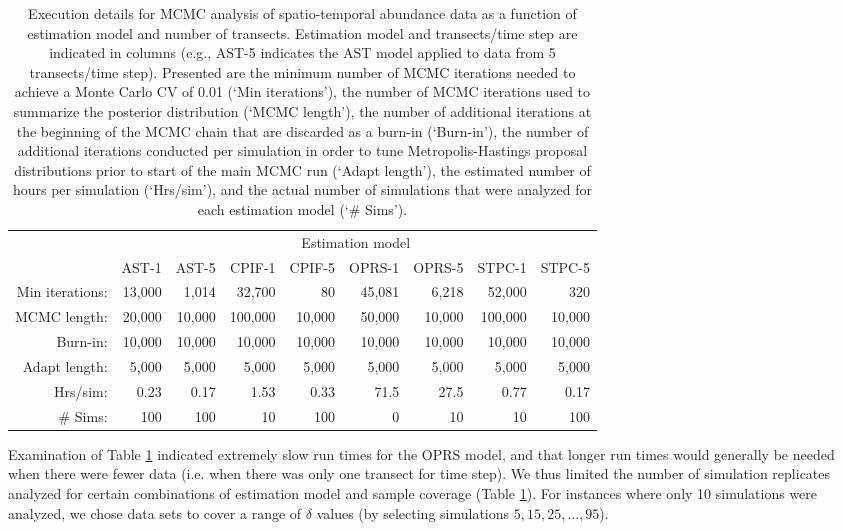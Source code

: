 \documentclass[12pt,fleqn]{article}
\begin{document}
\begin{flushleft}
\begin{table}
\caption{ Execution details for MCMC analysis of spatio-temporal abundance data as a function of estimation model and number of transects.  Estimation model and transects/time step are indicated in columns (e.g., AST-5 indicates the AST model applied to data from 5 transects/time step).  Presented are the minimum number of MCMC iterations needed to achieve a Monte Carlo CV of 0.01 (`Min iterations'), the number of MCMC iterations used to summarize the posterior distribution (`MCMC length'), the number of additional iterations at the beginning of the MCMC chain that are discarded as a burn-in (`Burn-in'), the number of additional iterations conducted per simulation in order to tune Metropolis-Hastings proposal distributions prior to start of the main MCMC run (`Adapt length'), the estimated number of hours per simulation (`Hrs/sim'), and the actual number of simulations that were analyzed for each estimation model (`\# Sims').}
\label{tab:run_times}
\begin{tabular}{rrrrrrrrr}
\\
 & \multicolumn{8}{c}{Estimation model} \\
 & AST-1 & AST-5 & CPIF-1 & CPIF-5 & OPRS-1 & OPRS-5 & STPC-1 & STPC-5 \\
\hline \hline
Min iterations:  & 13,000 & 1,014 & 32,700 & 80 & 45,081 & 6,218 & 52,000 & 320 \\
MCMC length: & 20,000  & 10,000 & 100,000 & 10,000 & 50,000 & 10,000 & 100,000 & 10,000 \\
Burn-in: & 10,000 & 10,000 & 10,000 & 10,000 & 10,000 & 10,000 & 10,000 & 10,000 \\
Adapt length: & 5,000 & 5,000 & 5,000 & 5,000 & 5,000 & 5,000 & 5,000 & 5,000 \\
Hrs/sim:   & 0.23 & 0.17 & 1.53 & 0.33 & 71.5 & 27.5 & 0.77 & 0.17 \\
\# Sims:  & 100 & 100 & 10 & 100 & 0 & 10 & 10 & 100 \\
\hline
\end{tabular}
\end{table}

\hspace{.5in} Examination of Table \ref{tab:run_times} indicated extremely slow run times for the OPRS model, and that longer run times would generally be needed when there were fewer data (i.e. when there was only one transect for time step).  We thus limited the number of simulation replicates analyzed for certain combinations of estimation model and sample coverage (Table \ref{tab:run_times}).  For instances where only 10 simulations were analyzed, we chose data sets to cover a range of $\delta$ values (by selecting simulations $5, 15, 25, \hdots, 95$).



\end{flushleft}
\end{document}
